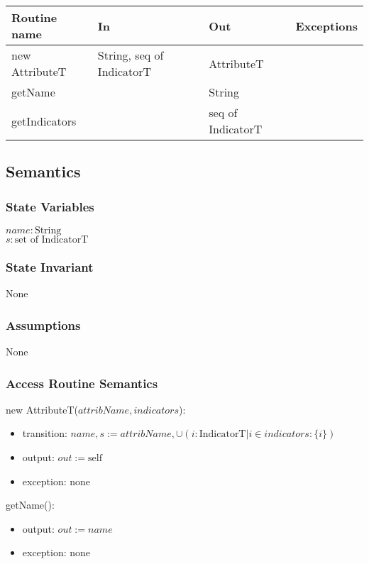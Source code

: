 \documentclass[12pt]{article}
\begin{document}
\begin{tabular}{| l | l | l | p{5cm} |}
\hline
\textbf{Routine name} & \textbf{In} & \textbf{Out} & \textbf{Exceptions}\\
\hline
new AttributeT & String, seq of IndicatorT & AttributeT & \\
\hline
getName & & String & ~\\
\hline
getIndicators & & seq of IndicatorT & ~\\
\hline
\end{tabular}

\subsection* {Semantics}

\subsubsection* {State Variables}

$\mathit{name}: \text{String}$\\
$s: \text{set of IndicatorT}$

\subsubsection* {State Invariant}

None

\subsubsection* {Assumptions}

None

\subsubsection* {Access Routine Semantics}

\noindent new AttributeT($\mathit{attribName}, \mathit{indicators}$):
\begin{itemize}
\item transition: $\mathit{name}, \mathit{s} := \mathit{attribName}, \cup ( i:
  \text{IndicatorT} | i \in \mathit{indicators} : \{ i \} )$
\item output: $out := \mbox{self}$
\item exception: none
\end{itemize}

\noindent getName():
\begin{itemize}
\item output: $out := \mathit{name}$
\item exception: none
\end{itemize}
\end{document}
